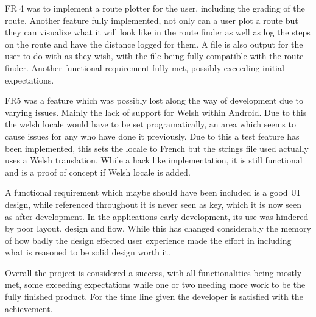FR 4 was to implement a route plotter for the user, including the grading of the route. Another feature fully implemented, not only can a user plot a route but they can visualize what it will look like in the route finder as well as log the steps on the route and have the distance logged for them. A file is also output for the user to do with as they wish, with the file being fully compatible with the route finder. Another functional requirement fully met, possibly exceeding initial expectations.

FR5 was a feature which was possibly lost along the way of development due to varying issues. Mainly the lack of support for Welsh within Android. Due to this the welsh locale would have to be set programatically, an area which seems to cause issues for any who have done it previously. Due to this a test feature has been implemented, this sets the locale to French but the strings file used actually uses a Welsh translation. While a hack like implementation, it is still functional and is a proof of concept if Welsh locale is added.

A functional requirement which maybe should have been included is a good UI design, while referenced throughout it is never seen as key, which it is now seen as after development. In the applications early development, its use was hindered by poor layout, design and flow. While this has changed considerably the memory of how badly the design effected user experience made the effort in including what is reasoned to be solid design worth it.

Overall the project is considered a success, with all functionalities being mostly met, some exceeding expectations while one or two needing more work to be the fully finished product. For the time line given the developer is satisfied with the achievement. 

 
